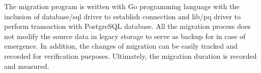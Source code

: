 The migration program is written with Go programming language with the inclusion of database/sql driver to establish connection and lib/pq driver to perform transaction with PostgreSQL database. All the migration process does not modify the source data in legacy storage to serve as backup for in case of emergence. In addition, the changes of migration can be easily tracked and recorded for verification purposes. Ultimately, the migration duration is recorded and measured.  


